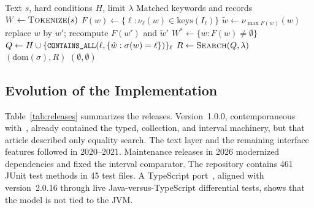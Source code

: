 \begin{algorithm}[t]
\caption{Coverage-Maximizing Keyword Search (Simplified)}
\label{alg:keyword}
\begin{algorithmic}[1]
\Require Text $s$, hard conditions $H$, limit $\lambda$
\Ensure Matched keywords and records
\State $W\gets\textsc{Tokenize}(s)$
  \State $F(w)\gets\{\ell : \nu_\ell(w)\in\mathrm{keys}(I_\ell)\}$ 
  \State $\tilde w\gets\nu_{\max F(w)}(w)$ 
    \State replace $w$ by $w'$; recompute $F(w')$ and $\tilde w'$
  \EndIf
\EndFor
\State $W^\ast\gets\{w : F(w)\neq\emptyset\}$
    \State $Q\gets H\cup\{\texttt{\small CONTAINS\_ALL}(\ell,\{\tilde w:\sigma(w)=\ell\})\}_\ell$
    \State $R\gets\textsc{Search}(Q,\lambda)$ 
      \State \Return $(\mathrm{dom}(\sigma), R)$
    \EndIf
  \EndFor
\EndFor
\State \Return $(\emptyset,\emptyset)$
\end{algorithmic}
\end{algorithm}

\subsection{Evolution of the Implementation}
Table~\ref{tab:releases} summarizes the releases. Version~1.0.0, contemporaneous with~\cite{kapoor2020efficient}, already contained the typed, collection, and interval machinery, but that article described only equality search. The text layer and the remaining interface features followed in 2020--2021. Maintenance releases in 2026 modernized dependencies and fixed the interval comparator. The repository contains 461 JUnit test methods in 45 test files. A TypeScript port~\cite{kiarats2026software}, aligned with version~2.0.16 through live Java-versus-TypeScript differential tests, shows that the model is not tied to the JVM.

